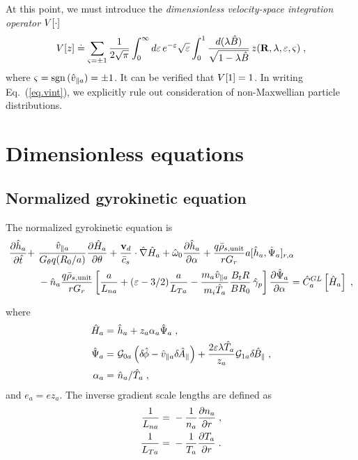 At this point, we must introduce the {\it dimensionless 
velocity-space integration operator} $V[\cdot]$
%
\begin{equation}
V[z] \doteq \sum_{{\varsigma}=\pm 1} \frac{1}{2\sqrt{\pi}}
\int_0^\infty  d{\varepsilon} \, e^{-{\varepsilon}} \sqrt{{\varepsilon}} 
\int_0^1 \frac{d(\lambda\hat{B})}{\sqrt{1-\lambda\hat{B}}} 
\, z(\mathbf{R},\lambda,{\varepsilon},{\varsigma}) \; ,
\label{eq.vint}
\end{equation}
%
where ${\varsigma} = {\rm sgn}\,(\hat{v}_{\parallel a}) = \pm 1$.  It can be verified 
that $V[1]=1$.  In writing Eq.~(\ref{eq.vint}), we explicitly 
rule out consideration of non-Maxwellian particle distributions.

\section{Dimensionless equations}

\subsection{Normalized gyrokinetic equation}

The normalized gyrokinetic equation is
%
\begin{align}
\frac{\partial\hat{h}_a}{\partial\hat{t}} 
+ &~\frac{\hat{v}_{\parallel a}}{G_\theta q (R_0/a)} \frac{\partial \hat{H}_a}{\partial\theta} 
+ \frac{\mathbf{v}_d}{\bar{c}_s} \cdot \hat{\nabla} \hat{H}_a
+ \hat{\omega}_0 \frac{\partial\hat{h}_a}{\partial\alpha}
+ \frac{q \bar{\rho}_{s,{\rm unit}}}{r G_r} a [\hat{h}_a,\hat{\Psi}_a]_{r,\alpha} \nonumber \\
 &~ - {\hat n}_a \frac{q\bar{\rho}_{s,{\rm unit}}}{r G_r} 
 \left[ \frac{a}{L_{na}} + ({\varepsilon}-3/2) \frac{a}{L_{Ta}} 
 - \frac{m_a \hat{v}_{\parallel a}}{m_i \hat{T}_a} \frac{B_t R}{B R_0} \, \hat{\gamma}_p \right] 
 \frac{\partial \hat{\Psi}_a}{\partial\alpha} 
= \hat{C}_a^{GL}\left[\hat{H}_a\right] \; ,
\end{align}

\noindent
where
%
\begin{align}
\hat{H}_a = &~\hat{h}_a + z_a \alpha_a \hat{\Psi}_a \; , \\
\hat{\Psi}_a = &~{\cal G}_{0a} \left( \delta \hskip -1pt \hat{\phi} - \hat{v}_{\parallel a} \delta \hskip -1pt \hat{A}_\parallel \right) + 
\frac{2 \varepsilon \lambda \hat{T}_a}{z_a} {\cal G}_{1a}\delta \hskip -1pt \hat{B}_\parallel \; , \\ 
\alpha_a = &~\hat{n}_a/\hat{T}_a \; , 
\end{align}
%
and $e_a = e z_a$.  The inverse gradient scale lengths are defined as 
%
\begin{align}
\frac{1}{L_{na}} = &~-\frac{1}{n_a}\frac{\partial n_a}{\partial r} \; , \\
\frac{1}{L_{Ta}} = &~-\frac{1}{T_a}\frac{\partial T_a}{\partial r} \; .
\end{align}

